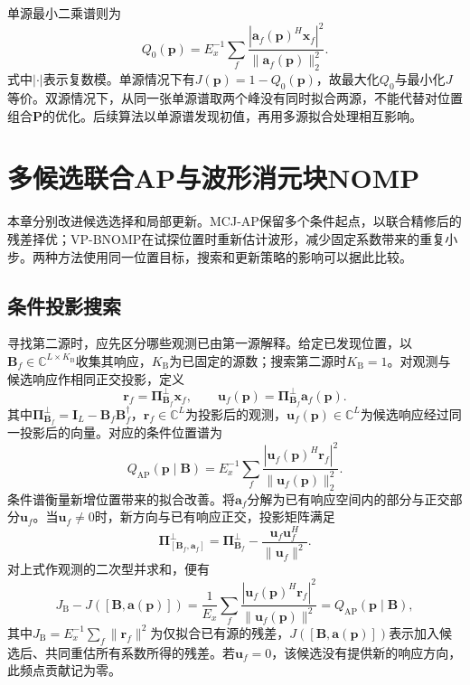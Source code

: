 \documentclass[a4paper,fleqn]{cas-sc}
\numberwithin{equation}{section}
\numberwithin{figure}{section}
\numberwithin{table}{section}
\newcommand{\C}{\mathbb C}
\begin{document}
单源最小二乘谱则为
\begin{equation}
 Q_0(\bm p)=E_x^{-1}\sum_f
 \frac{|\bm a_f(\bm p)^H\bm x_f|^2}{\|\bm a_f(\bm p)\|_2^2} .\label{eq:single}
\end{equation}
式中$|\cdot|$表示复数模。单源情况下有$J(\bm p)=1-Q_0(\bm p)$，故最大化$Q_0$与最小化$J$等价。双源情况下，从同一张单源谱取两个峰没有同时拟合两源，不能代替对位置组合$\bm P$的优化。后续算法以单源谱发现初值，再用多源拟合处理相互影响。



\section{多候选联合AP与波形消元块NOMP}\label{sec:methods}
本章分别改进候选选择和局部更新。MCJ-AP保留多个条件起点，以联合精修后的残差择优；VP-BNOMP在试探位置时重新估计波形，减少固定系数带来的重复小步。两种方法使用同一位置目标，搜索和更新策略的影响可以据此比较。
\subsection{条件投影搜索}
寻找第二源时，应先区分哪些观测已由第一源解释。给定已发现位置，以$\bm B_f\in\C^{L\times K_{\mathrm B}}$收集其响应，$K_{\mathrm B}$为已固定的源数；搜索第二源时$K_{\mathrm B}=1$。对观测与候选响应作相同正交投影，定义
\begin{equation}
 \bm r_f=\bm\Pi_{\bm B_f}^{\perp}\bm x_f,\qquad
 \bm u_f(\bm p)=\bm\Pi_{\bm B_f}^{\perp}\bm a_f(\bm p).
\end{equation}
其中$\bm\Pi_{\bm B_f}^{\perp}=\bm I_L-\bm B_f\bm B_f^\dagger$，$\bm r_f\in\C^L$为投影后的观测，$\bm u_f(\bm p)\in\C^L$为候选响应经过同一投影后的向量。对应的条件位置谱为
\begin{equation}
 Q_{\mathrm{AP}}(\bm p\mid\bm B)
 =E_x^{-1}\sum_f\frac{|\bm u_f(\bm p)^H\bm r_f|^2}
 {\|\bm u_f(\bm p)\|_2^2}.\label{eq:conditional}
\end{equation}
条件谱衡量新增位置带来的拟合改善。将$\bm a_f$分解为已有响应空间内的部分与正交部分$\bm u_f$。当$\bm u_f\ne0$时，新方向与已有响应正交，投影矩阵满足
\begin{equation}
 \bm\Pi_{[\bm B_f,\bm a_f]}^{\perp}
 =\bm\Pi_{\bm B_f}^{\perp}
 -\frac{\bm u_f\bm u_f^H}{\|\bm u_f\|^2} .
\end{equation}
对上式作观测的二次型并求和，便有
\begin{equation}
 J_{\mathrm B}-J([\bm B,\bm a(\bm p)])
 =\frac1{E_x}\sum_f\frac{|\bm u_f(\bm p)^H\bm r_f|^2}
 {\|\bm u_f(\bm p)\|^2}
 =Q_{\mathrm{AP}}(\bm p\mid\bm B),\label{eq:conditionalGain}
\end{equation}
其中$J_{\mathrm B}=E_x^{-1}\sum_f\|\bm r_f\|^2$为仅拟合已有源的残差，$J([\bm B,\bm a(\bm p)])$表示加入候选后、共同重估所有系数所得的残差。若$\bm u_f=0$，该候选没有提供新的响应方向，此频点贡献记为零。
\end{document}
